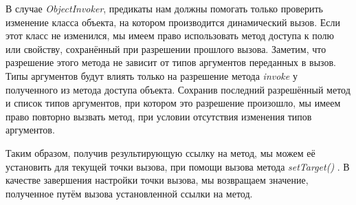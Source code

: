 В случае \textit{ObjectInvoker}, предикаты нам должны помогать только проверить изменение класса объекта, на котором производится динамический вызов. Если этот класс не изменился, мы имеем право использовать метод доступа к полю или свойству, сохранённый при разрешении прошлого вызова. Заметим, что разрешение этого метода не зависит от типов аргументов переданных в вызов. Типы аргументов будут влиять только на разрешение метода \textit{invoke} у полученного из метода доступа объекта. Сохранив последний разрешённый метод и список типов аргументов, при котором это разрешение произошло, мы имеем право повторно вызвать метод, при условии отсутствия изменения типов аргументов.

Таким образом, получив результирующую ссылку на метод, мы можем её установить для текущей точки вызова, при помощи вызова метода 	\textit{setTarget()} \cite{javadoc:MutableCallSite}. В качестве завершения настройки точки вызова, мы возвращаем значение, полученное путём вызова установленной ссылки на метод.